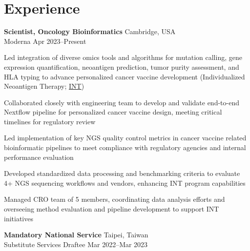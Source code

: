 \section{Experience}

\begin{entrylist}

\item \textbf{Scientist, Oncology Bioinformatics} \hfill Cambridge, USA\\
    Moderna \hfill
    Apr 2023--Present
\begin{detaillist}
    \item Led integration of diverse omics tools and algorithms for mutation calling, gene expression quantification, neoantigen prediction, tumor purity assessment, and HLA typing to advance personalized cancer vaccine development (Individualized Neoantigen Therapy; \href{https://en.wikipedia.org/wiki/MRNA-4157/V940}{INT})
    \item Collaborated closely with engineering team to develop and validate end-to-end Nextflow pipeline for personalized cancer vaccine design, meeting critical timelines for regulatory review
    \item Led implementation of key NGS quality control metrics in cancer vaccine related bioinformatic pipelines to meet compliance with regulatory agencies and internal performance evaluation
    \item Developed standardized data processing and benchmarking criteria to evaluate 4+ NGS sequencing workflows and vendors, enhancing INT program capabilities
    \item Managed CRO team of 5 members, coordinating data analysis efforts and overseeing method evaluation and pipeline development to support INT initiatives
\end{detaillist}

\item \textbf{Mandatory National Service} \hfill Taipei, Taiwan\\
Substitute Services Draftee \hfill
Mar 2022--Mar 2023


\end{entrylist}
